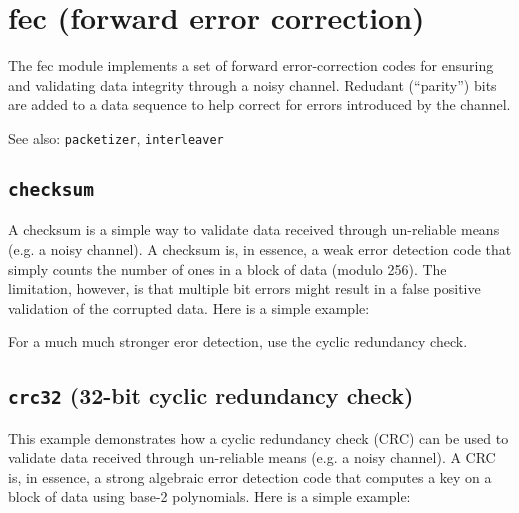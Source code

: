 % 
%

\section{fec (forward error correction)}
\label{module:fec}
The fec module implements a set of forward error-correction codes for
ensuring and validating data integrity through a noisy channel.
Redudant (``parity'') bits are added to a data sequence to help correct for
errors introduced by the channel.

See also: {\tt packetizer}, {\tt interleaver}

\subsection{{\tt checksum}}
\label{module:fec:checksum}
A checksum is a simple way to validate data received through un-reliable means
(e.g. a noisy channel).
A checksum is, in essence, a weak error detection code that simply counts the
number of ones in a block of data (modulo 256).
The limitation, however, is that multiple bit errors might result in a false
positive validation of the corrupted data.
Here is a simple example:
%

%
For a much much stronger eror detection, use the cyclic redundancy check.

\subsection{{\tt crc32} (32-bit cyclic redundancy check)}
\label{module:fec:crc32}
This example demonstrates how a cyclic redundancy check (CRC) can be used to
validate data received through un-reliable means (e.g. a noisy channel).
A CRC is, in essence, a strong algebraic error detection code that computes a
key on a block of data using base-2 polynomials.
Here is a simple example:
%


